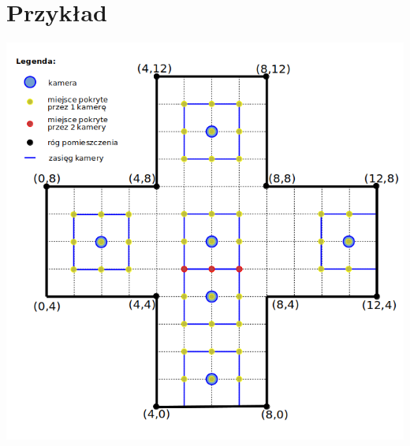 \documentclass[12pt,a4paper]{article}
\begin{document}
%
\section{Przykład}
\begin{center}
	\includegraphics[scale=0.5]{img/example_2.png}
\end{center}
\end{document}
